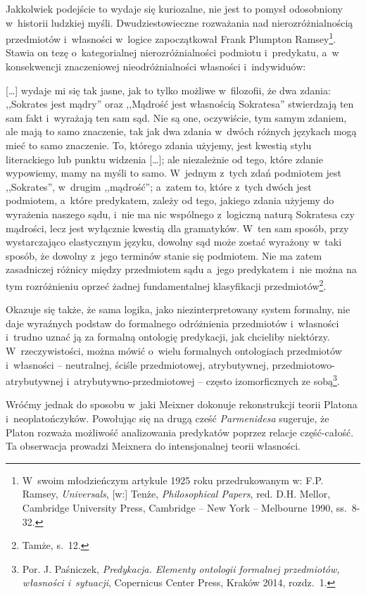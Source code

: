 Jakkolwiek podejście to wydaje się kuriozalne, nie jest to pomysł odosobniony w~historii ludzkiej myśli. Dwudziestowieczne rozważania nad nierozróżnialnością przedmiotów i~własności w~logice zapoczątkował Frank Plumpton Ramsey\footnote{W~swoim młodzieńczym artykule 1925 roku przedrukowanym w: F.P. Ramsey, \textit{Universals}, [w:] Tenże, \textit{Philosophical Papers}, red. D.H. Mellor, Cambridge University Press, Cambridge -- New York -- Melbourne 1990, ss.~8-32.}. Stawia on tezę o~kategorialnej nierozróżnialności podmiotu i~predykatu, a~w konsekwencji znaczeniowej nieodróżnialności własności i~indywiduów:

[…] wydaje mi się tak jasne, jak to tylko możliwe w~filozofii, że dwa zdania: ,,Sokrates jest mądry'' oraz ,,Mądrość jest własnością Sokratesa'' stwierdzają ten sam fakt i~wyrażają ten sam sąd. Nie są one, oczywiście, tym samym zdaniem, ale mają to samo znaczenie, tak jak dwa zdania w~dwóch różnych językach mogą mieć to samo znaczenie. To, którego zdania użyjemy, jest kwestią stylu literackiego lub punktu widzenia […]; ale niezależnie od tego, które zdanie wypowiemy, mamy na myśli to samo. W~jednym z~tych zdań podmiotem jest ,,Sokrates'', w~drugim ,,mądrość''; a~zatem to, które z~tych dwóch jest podmiotem, a~które predykatem, zależy od tego, jakiego zdania użyjemy do wyrażenia naszego sądu, i~nie ma nic wspólnego z~logiczną naturą Sokratesa czy mądrości, lecz jest wyłącznie kwestią dla gramatyków. W~ten sam sposób, przy wystarczająco elastycznym języku, dowolny sąd może zostać wyrażony w~taki sposób, że dowolny z~jego terminów stanie się podmiotem. Nie ma zatem zasadniczej różnicy między przedmiotem sądu a~jego predykatem i~nie można na tym rozróżnieniu oprzeć żadnej fundamentalnej klasyfikacji przedmiotów\footnote{Tamże, s.~12.}.

Okazuje się także, że sama logika, jako niezinterpretowany system formalny, nie daje wyraźnych podstaw do formalnego odróżnienia przedmiotów i~własności i~trudno uznać ją za formalną ontologię predykacji, jak chcieliby niektórzy. W~rzeczywistości, można mówić o~wielu formalnych ontologiach przedmiotów i~własności -- neutralnej, ściśle przedmiotowej, atrybutywnej, przedmiotowo-atrybutywnej i~atrybutywno-przedmiotowej -- często izomorficznych ze sobą\footnote{Por. J. Paśniczek, \textit{Predykacja. Elementy ontologii formalnej przedmiotów, własności i~sytuacji}, Copernicus Center Press, Kraków 2014, rozdz.~1.}.

Wróćmy jednak do sposobu w~jaki Meixner dokonuje rekonstrukcji teorii Platona i~neoplatończyków. Powołując się na drugą cześć \textit{Parmenidesa} sugeruje, że Platon rozważa możliwość analizowania predykatów poprzez relacje część-całość. Ta obserwacja prowadzi Meixnera do intensjonalnej teorii własności.

